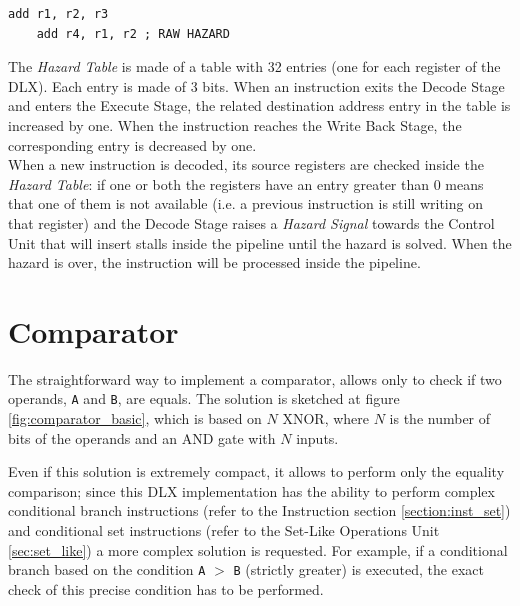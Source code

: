 \begin{lstlisting}[style=mips,nolol, caption={Example of DLX ASM code for RAW Hazard},label=raw_hazard]
	add r1, r2, r3
	add r4, r1, r2 ; RAW HAZARD
\end{lstlisting}

The \emph{Hazard Table} is made of a table with 32 entries (one for each register of the DLX). Each entry is made of 3 bits. When an instruction exits the Decode Stage and enters the Execute Stage, the related destination address entry in the table is increased by one. When the instruction reaches the Write Back Stage, the corresponding entry is decreased by one.\\

When a new instruction is decoded, its source registers are checked inside the \emph{Hazard Table}: if one or both the registers have an entry greater than 0 means that one of them is not available (i.e. a previous instruction is still writing on that register) and the Decode Stage raises a \emph{Hazard Signal} towards the Control Unit that will insert stalls inside the pipeline until the hazard is solved. When the hazard is over, the instruction will be processed inside the pipeline.

\section{Comparator}
\label{sec:comparator}
The straightforward way to implement a comparator, allows only to check if two operands, \texttt{A} and \texttt{B}, are equals. The solution is sketched at figure \ref{fig:comparator_basic}, which is based on $N$ XNOR, where $N$ is the number of bits of the operands and an AND gate with $N$ inputs.

Even if this solution is extremely compact, it allows to perform only the equality comparison; since this DLX implementation has the ability to perform complex conditional branch instructions (refer to the Instruction section \ref{section:inst_set}) and conditional set instructions (refer to the Set-Like Operations Unit \ref{sec:set_like}) a more complex solution is requested. For example, if a conditional branch based on the condition \texttt{A} $>$ \texttt{B} (strictly greater) is executed, the exact check of this precise condition has to be performed.

